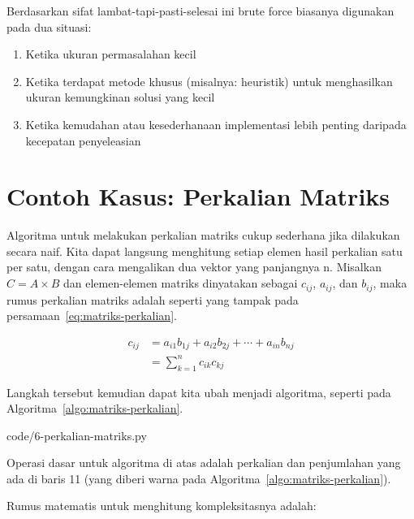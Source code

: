 Berdasarkan sifat lambat-tapi-pasti-selesai ini brute force biasanya digunakan pada dua situasi:

\begin{enumerate}
    \item Ketika ukuran permasalahan kecil
    \item Ketika terdapat metode khusus (misalnya: heuristik) untuk menghasilkan ukuran kemungkinan solusi yang kecil
    \item Ketika kemudahan atau kesederhanaan implementasi lebih penting daripada kecepatan penyeleasian
\end{enumerate}

\section{Contoh Kasus: Perkalian Matriks}

Algoritma untuk melakukan perkalian matriks cukup sederhana jika dilakukan secara naif. Kita dapat langsung menghitung setiap elemen hasil perkalian satu per satu, dengan cara mengalikan dua vektor yang panjangnya n. Misalkan $C = A \times B$ dan elemen-elemen matriks dinyatakan sebagai $c_{ij}$, $a_{ij}$, dan $b_{ij}$, maka rumus perkalian matriks adalah seperti yang tampak pada persamaan~\ref{eq:matriks-perkalian}.

\begin{equation}\label{eq:matriks-perkalian}
    \begin{aligned}
        c_{ij} & = a_{i1}b_{1j} + a_{i2}b_{2j} + \cdots + a_{in}b_{nj} \\
               & = \sum\limits_{k = 1}^n c_{ik}c_{kj}
    \end{aligned}
\end{equation}

Langkah tersebut kemudian dapat kita ubah menjadi algoritma, seperti pada Algoritma~\ref{algo:matriks-perkalian}.


                {code/6-perkalian-matriks.py}

Operasi dasar untuk algoritma di atas adalah perkalian dan penjumlahan yang ada di baris 11 (yang diberi warna pada Algoritma~\ref{algo:matriks-perkalian}).

Rumus matematis untuk menghitung kompleksitasnya adalah:


